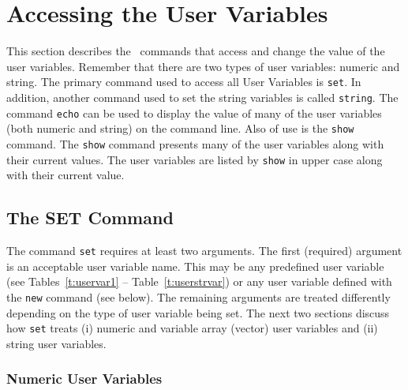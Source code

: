 \section		{Accessing the User Variables}

This section describes the \wip\ commands that access and change the
value of the user variables.
Remember that there are two types of user variables:
numeric and string.
The primary command used to access all User Variables
is {\tt set}.
In addition, another command used to set the string variables
is called {\tt string}.
The command {\tt echo}
can be used to display the value of many of the user variables
(both numeric and string) on the command line.
Also of use is the {\tt show} command.
The {\tt show} command presents many of the user variables
along with their current values.
The user variables are listed by {\tt show} in upper case along
with their current value.

\subsection*		{The SET Command}

The command {\tt set} requires at least two arguments.
The first (required) argument is an acceptable user variable name.
This may be any predefined user variable
(see Tables~\ref{t:uservar1} -- Table~\ref{t:userstrvar})
or any user variable defined with the
{\tt new}
command (see below).
The remaining arguments are treated 
differently depending on the type of user variable being set.
The next two sections discuss how {\tt set} treats (i) numeric and variable
array (vector) user variables and (ii) string user variables.

\subsubsection*		{Numeric User Variables}


